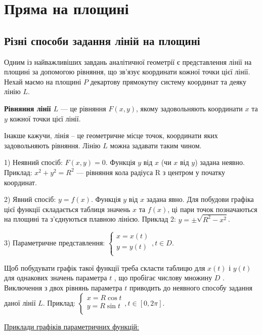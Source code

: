 \chapter{Пряма на площині}

\section{Різні способи задання ліній на площині}

Одним із найважливіших завдань аналітичної геометрії є представлення лінії
на площині за допомогою рівняння, що зв’язує координати кожної точки цієї лінії.
Нехай маємо на площині $P$ декартову прямокутну систему координат та деяку
лінію $L$.

\begin{definition}
	\textbf{Рівняння лінії $L$} --- це рівняння $F(x,y)$, якому задовольняють
	координати $x$ та $y$ кожної точки цієї лінії. 
\end{definition}

Інакше кажучи, лінія – це геометричне місце точок, координати яких
задовольняють рівняння. Лінію $L$ можна задавати таким чином. 

1) Неявний спосіб: $F(x,y) = 0$. Функція $y$ від $x$ (чи $x$ від $y$) задана неявно.
Приклад: $x^2 + y^2 = R^2$ --- рівняння кола радіуса R з центром у початку координат.

2) Явний спосіб: $y = f(x)$. Функція $y$ від $x$ задана явно. Для побудови графіка
цієї функції складається таблиця значень $x$ та $f(x)$, ці пари точок позначаються на
площині та з’єднуються плавною лінією.
Приклад 2: $y = \pm\sqrt{R^2 - x^2}$. 

3) Параметричне представлення: $\left\{\begin{array}{l}
	x = x(t) \\
	y = y(t) \\	
\end{array}\right., t \in D$.
	
Щоб побудувати графік
такої функції треба скласти таблицю для $x(t)$ і $y(t)$ для однакових значень
параметра $t$ , що пробігає числову множину $D$ . Виключення з двох рівнянь
параметра $t$ приводить до неявного способу задання даної лінії $L$. 
Приклад: $\left\{\begin{array}{l}
	x = R\cos t \\
	y = R\sin t \\	
\end{array}\right., t \in [0, 2\pi]$.

\underline{Приклади графіків параметричних функцій:}


